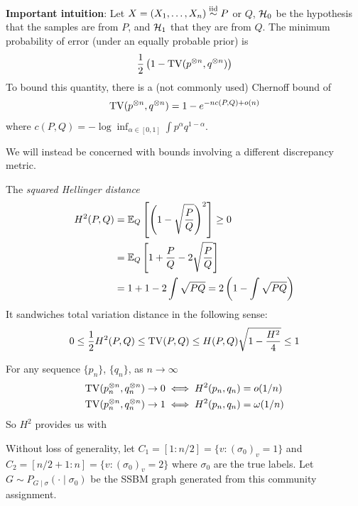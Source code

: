 \textbf{Important intuition}: Let $X = (X_1, \ldots, X_n) \overset{\text{iid}}{\sim} P$ or $Q$,
$\mathcal{H}_0$ be the hypothesis that the samples are from $P$,
and $\mathcal{H}_1$ that they are from $Q$.
The minimum probability of error (under an equally probable prior) is
\begin{align}
  \frac{1}{2} \left( 1 - \operatorname{TV}(p^{\otimes n}, q^{\otimes n})\right)
\end{align}
To bound this quantity, there is a (not commonly used) Chernoff bound of
\begin{align}
  \operatorname{TV}(p^{\otimes n}, q^{\otimes n}) = 1 - e^{-n c(P, Q) + o(n)}
\end{align}
where $c(P, Q) = -\log \inf_{\alpha \in [0,1]} \int p^\alpha q^{1-\alpha}$.

We will instead be concerned with bounds involving a different discrepancy
metric.
\begin{definition}
  The \emph{squared Hellinger distance}
  \begin{align}
    H^2(P, Q)
    &= \mathbb{E}_Q\left[ \left(1 - \sqrt{\frac{P}{Q}}\right)^2 \right]
      \geq 0 \\
    &= \mathbb{E}_Q\left[
      1 + \frac{P}{Q} - 2 \sqrt{\frac{P}{Q}}
    \right] \\
    &= 1 + 1 - 2 \int \sqrt{PQ}
    = 2 \left( 1 - \int \sqrt{PQ} \right)
  \end{align}
  It sandwiches total variation distance in the following sense:
  \begin{align}
    0 \leq \frac{1}{2} H^2(P, Q)
    \leq \operatorname{TV}(P, Q)
    \leq H(P, Q) \sqrt{1 - \frac{H^2}{4}}
    \leq 1
  \end{align}
\end{definition}

\begin{lemma}
  For any sequence $\{p_n\}$, $\{q_n\}$, as $n \to \infty$
  \begin{align}
    \operatorname{TV}(p_n^{\otimes n}, q_n^{\otimes n}) \to 0 &\iff H^2(p_n, q_n) = o(1/n) \\
    \operatorname{TV}(p_n^{\otimes n}, q_n^{\otimes n}) \to 1 &\iff H^2(p_n, q_n) = \omega(1/n)
  \end{align}
  So $H^2$ provides us with
\end{lemma}

Without loss of generality, let $C_1 = [1:n/2] = \{ v : (\sigma_0)_v = 1\}$
and $C_2 = [n/2+1:n] = \{ v : (\sigma_0)_v = 2\}$
where $\sigma_0$ are the true labels.
Let $G \sim P_{G \mid \sigma}(\cdot \mid \sigma_0)$ be the SSBM graph
generated from this community assignment.

